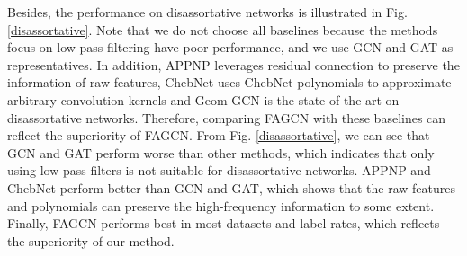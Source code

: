 \documentclass[letterpaper]{article} %
\begin{document}
Besides, the performance on disassortative networks is illustrated in Fig. \ref{disassortative}. Note that we do not choose all baselines because the methods focus on low-pass filtering have poor performance, and we use GCN and GAT as representatives. In addition, APPNP leverages residual connection to preserve the information of raw features, ChebNet uses ChebNet polynomials to approximate arbitrary convolution kernels and Geom-GCN is the state-of-the-art on disassortative networks. Therefore, comparing FAGCN with these baselines can reflect the superiority of FAGCN. From Fig. \ref{disassortative}, we can see that GCN and GAT perform worse than other methods, which indicates that only using low-pass filters is not suitable for disassortative networks. APPNP and ChebNet perform better than GCN and GAT, which shows that the raw features and polynomials can preserve the high-frequency information to some extent. Finally, FAGCN performs best in most datasets and label rates, which reflects the superiority of our method.



\end{document}
